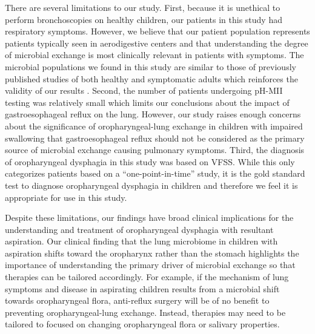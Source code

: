 There are several limitations to our study.
First, because it is unethical to perform bronchoscopies on healthy children, our patients in this study had respiratory symptoms.
However, we believe that our patient population represents patients typically seen in aerodigestive centers and that understanding the degree of microbial exchange is most clinically relevant in patients with symptoms.
The microbial populations we found in this study are similar to those of previously published studies of both healthy and symptomatic adults which reinforces the validity of our results \cite{Bassis2015source,Charlson2011topographical,erbDownward-2011-COPD,morris-2013-healthsmokers}.
Second, the number of patients undergoing pH-MII testing was relatively small which limits our conclusions about the impact of gastroesophageal reflux on the lung.
However, our study raises enough concerns about the significance of oropharyngeal-lung exchange in children with impaired swallowing that gastroesophageal reflux should not be considered as the primary source of microbial exchange causing pulmonary symptoms.
Third, the diagnosis of oropharyngeal dysphagia in this study was based on VFSS.
While this only categorizes patients based on a “one-point-in-time” study, it is the gold standard test to diagnose oropharyngeal dysphagia in children and therefore we feel it is appropriate for use in this study.

Despite these limitations, our findings have broad clinical implications for the understanding and treatment of oropharyngeal dysphagia with resultant aspiration.
Our clinical finding that the lung microbiome in children with aspiration shifts toward the oropharynx rather than the stomach highlights the importance of understanding the primary driver of microbial exchange so that therapies can be tailored accordingly.
For example, if the mechanism of lung symptoms and disease in aspirating children results from a microbial shift towards oropharyngeal flora, anti-reflux surgery will be of no benefit to preventing oropharyngeal-lung exchange.
Instead, therapies may need to be tailored to focused on changing oropharyngeal flora or salivary properties.

